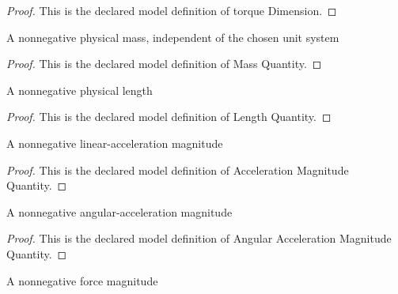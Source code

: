 \begin{proof}
  This is the declared model definition of torque Dimension.
\end{proof}
\begin{definition}
  \label{def:physics:phyx-mini-0784:phyxminiproblems-problemphyxmini0784-massquantity}
  A nonnegative physical mass, independent of the chosen unit system
\end{definition}
\begin{proof}
  This is the declared model definition of Mass Quantity.
\end{proof}
\begin{definition}
  \label{def:physics:phyx-mini-0784:phyxminiproblems-problemphyxmini0784-lengthquantity}
  A nonnegative physical length
\end{definition}
\begin{proof}
  This is the declared model definition of Length Quantity.
\end{proof}
\begin{definition}
  \label{def:physics:phyx-mini-0784:phyxminiproblems-problemphyxmini0784-accelerationmagnitudequantity}
  A nonnegative linear-acceleration magnitude
\end{definition}
\begin{proof}
  This is the declared model definition of Acceleration Magnitude Quantity.
\end{proof}
\begin{definition}
  \label{def:physics:phyx-mini-0784:phyxminiproblems-problemphyxmini0784-angularaccelerationmagnitudequantity}
  A nonnegative angular-acceleration magnitude
\end{definition}
\begin{proof}
  This is the declared model definition of Angular Acceleration Magnitude Quantity.
\end{proof}
\begin{definition}
  \label{def:physics:phyx-mini-0784:phyxminiproblems-problemphyxmini0784-forcemagnitudequantity}
  A nonnegative force magnitude
\end{definition}
